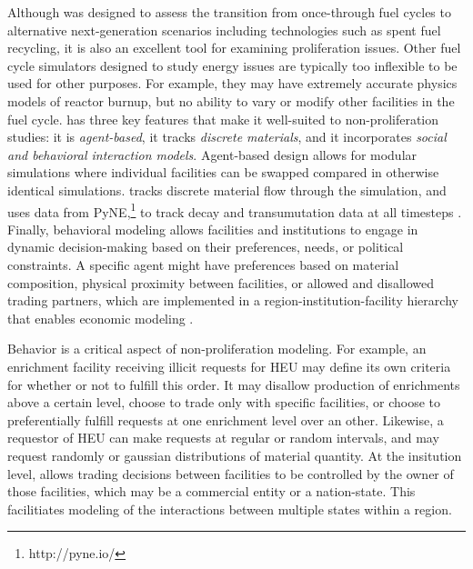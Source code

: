 Although \Cyclus was designed to assess the transition from once-through fuel cycles to alternative next-generation scenarios including technologies such as spent fuel recycling, it is also an excellent tool for examining proliferation issues.  Other fuel cycle simulators designed to study energy issues are typically too inflexible to be used for other purposes. For example, they may have extremely accurate physics models of reactor burnup, but no ability to vary or modify other facilities in the fuel cycle.  \Cyclus has three key features that make it well-suited to non-proliferation studies: it is \textit{agent-based}, it tracks \textit{discrete materials}, and it incorporates \textit{social and behavioral interaction models}. Agent-based design allows for modular simulations where individual facilities can be swapped compared in otherwise identical simulations. \Cyclus tracks discrete material flow through the simulation, and uses data from PyNE,\footnote{http://pyne.io/} to track decay and transumutation data at all timesteps \cite{Scopatz2012b, huff_integrated:_2013}. Finally, behavioral modeling allows facilities and institutions to engage in dynamic decision-making based on their preferences, needs, or political constraints.  A specific agent might have preferences based on material composition, physical proximity between facilities, or allowed and disallowed trading partners, which are implemented in a region-institution-facility hierarchy that enables economic modeling \cite{oliver_geniusv2:_2009}.

Behavior is a critical aspect of non-proliferation modeling. For example, an enrichment facility receiving illicit requests for \gls{HEU} may define its own criteria for whether or not to fulfill this order.  It may disallow production of enrichments above a certain level, choose to trade only with specific facilities, or choose to preferentially fulfill requests at one enrichment level over an other.  Likewise, a requestor of \gls{HEU} can make requests at regular or random intervals, and may request randomly or gaussian distributions of material quantity.  
At the insitution level, \Cyclus allows trading decisions between facilities to be controlled by the owner of those facilities, which may be a commercial entity or a nation-state.  This facilitiates modeling of the interactions between multiple states within a region.  





